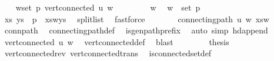 \begin{isabellebody}
%
\isadelimproof
%
\endisadelimproof
%
\isatagproof
{}\isamarkupfalse%
{\isacharminus}{\kern0pt}\isanewline
\ \ \isamarkupfalse%
\ {\isachardoublequoteopen}{\isasymforall}w{\isasymin}set\ p{\isachardot}{\kern0pt}\ vert{\isacharunderscore}{\kern0pt}connected\ u\ w{\isachardoublequoteclose}\isanewline
\ \ \isamarkupfalse%
\isanewline
\ \ \ \ \isamarkupfalse%
\ w\ \isamarkupfalse%
\ {\isachardoublequoteopen}w\ {\isasymin}\ set\ p{\isachardoublequoteclose}\isanewline
\ \ \ \ \isamarkupfalse%
\ \isamarkupfalse%
\ xs\ ys\ \ {\isachardoublequoteopen}p\ {\isacharequal}{\kern0pt}\ xs{\isacharat}{\kern0pt}{\isacharbrackleft}{\kern0pt}w{\isacharbrackright}{\kern0pt}{\isacharat}{\kern0pt}ys{\isachardoublequoteclose}\ \isamarkupfalse%
\ split{\isacharunderscore}{\kern0pt}list\ \isamarkupfalse%
\ fastforce\isanewline
\ \ \ \ \isamarkupfalse%
\ \isamarkupfalse%
\ {\isachardoublequoteopen}connecting{\isacharunderscore}{\kern0pt}path\ u\ w\ {\isacharparenleft}{\kern0pt}xs{\isacharat}{\kern0pt}{\isacharbrackleft}{\kern0pt}w{\isacharbrackright}{\kern0pt}{\isacharparenright}{\kern0pt}{\isachardoublequoteclose}\ \isamarkupfalse%
\ conn{\isacharunderscore}{\kern0pt}path\ \isamarkupfalse%
\ connecting{\isacharunderscore}{\kern0pt}path{\isacharunderscore}{\kern0pt}def\ \isamarkupfalse%
\ is{\isacharunderscore}{\kern0pt}gen{\isacharunderscore}{\kern0pt}path{\isacharunderscore}{\kern0pt}prefix\ \isamarkupfalse%
\ {\isacharparenleft}{\kern0pt}auto\ simp{\isacharcolon}{\kern0pt}\ hd{\isacharunderscore}{\kern0pt}append{\isacharparenright}{\kern0pt}\isanewline
\ \ \ \ \isamarkupfalse%
\ \isamarkupfalse%
\ {\isachardoublequoteopen}vert{\isacharunderscore}{\kern0pt}connected\ u\ w{\isachardoublequoteclose}\ \isamarkupfalse%
\ vert{\isacharunderscore}{\kern0pt}connected{\isacharunderscore}{\kern0pt}def\ \isamarkupfalse%
\ blast\isanewline
\ \ \isamarkupfalse%
\isanewline
\ \ \isamarkupfalse%
\ \isamarkupfalse%
\ {\isacharquery}{\kern0pt}thesis\ \isamarkupfalse%
\ vert{\isacharunderscore}{\kern0pt}connected{\isacharunderscore}{\kern0pt}rev\ vert{\isacharunderscore}{\kern0pt}connected{\isacharunderscore}{\kern0pt}trans\ \isamarkupfalse%
\ is{\isacharunderscore}{\kern0pt}connected{\isacharunderscore}{\kern0pt}set{\isacharunderscore}{\kern0pt}def\ \isamarkupfalse%

\end{isabellebody}
